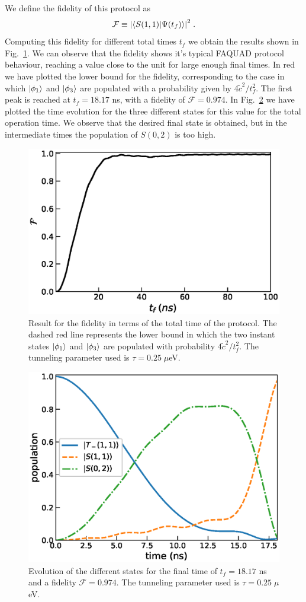 \documentclass[a4paper,11pt]{article}
\begin{document}
We define the fidelity of this protocol as
\begin{equation}
	\mathcal{F}\equiv \abs{\braket{S(1,1)}{\Psi(t_f)}}^2\; .
\end{equation}
Computing this fidelity for different total times $t_f$ we obtain the results shown in Fig.~\ref{fig:FAQUAD_2QD_Results}. We can observe that the fidelity shows it's typical FAQUAD protocol behaviour, reaching a value close to the unit for large enough final times. In red we have plotted the lower bound for the fidelity, corresponding to the case in which $\ket{\phi_1}$ and $\ket{\phi_3}$ are populated with a probability given by $4\tilde{c}^2/t_f^2$. The first peak is reached at $t_f=18.17$ ns, with a fidelity of $\mathcal{F}=0.974$. In Fig.~\ref{fig:states_evolution} we have plotted the time evolution for the three different states for this value for the total operation time. We observe that the desired final state is obtained, but in the intermediate times the population of $S(0,2)$ is too high.\\
\begin{figure}[!htbp]
	\centering
	\includegraphics[width=0.7\linewidth]{FAQUAD_2QD_Results.eps}
	\caption{Result for the fidelity in terms of the total time of the protocol. The dashed red line represents the lower bound in which the two instant states $\ket{\phi_1}$ and $\ket{\phi_3}$ are populated with probability $4\tilde{c}^2/t_f^2$. The tunneling parameter used is $\tau=0.25\; \mu$eV.}
	\label{fig:FAQUAD_2QD_Results}
\end{figure}

\begin{figure}[!htbp]
	\centering
	\includegraphics[width=0.7\linewidth]{states_evolution.eps}
	\caption{Evolution of the different states for the final time of $t_f=18.17$ ns and a fidelity $\mathcal{F}=0.974$. The tunneling parameter used is $\tau=0.25\; \mu$eV.}
	\label{fig:states_evolution}
\end{figure}
\end{document}
